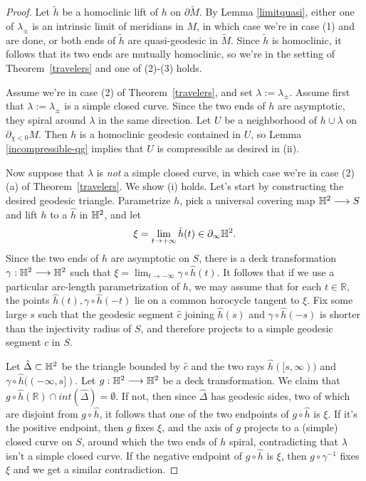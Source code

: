 \documentclass[12pt]{amsart}
\theoremstyle{definition}
\theoremstyle{remark}
\newcommand{\BR}{\mathbb R} \newcommand{\BD}{\mathbb D}
\begin{document}
\begin{proof}
Let $\tilde h$ be a homoclinic lift of $h$ on $\partial \tilde M$. By Lemma \ref{limitquasi}, either one of $\lambda_\pm$ is an intrinsic limit of meridians in $M$, in which case we're in case (1) and are done, or both ends of $\tilde h$ are quasi-geodesic in $\tilde M$. Since $\tilde h$ is homoclinic, it follows that its two ends are  mutually homoclinic, so we're in the setting of Theorem~\ref{travelers} and one of (2)-(3) holds. 

\medskip

Assume we're in case (2) of Theorem~\ref{travelers}, and set $\lambda:=\lambda_\pm$. Assume first that $\lambda:=\lambda_\pm$ is a simple closed curve.  Since the two ends of $h$ are asymptotic, they spiral around $\lambda$ in the same direction. Let $U$ be a neighborhood of $h \cup \lambda $ on $\partial_{\chi<0} M$. Then $h$ is a homoclinic geodesic contained in $U$, so Lemma \ref{incompressible-qg} implies that $U$ is compressible as desired in (ii).

Now suppose that $\lambda$ is \emph{not} a simple closed curve, in which case we're in case (2) (a) of Theorem~\ref{travelers}. We show (i) holds. Let's start by constructing the desired geodesic triangle. Parametrize $h$, pick a universal covering map $\mathbb H^2 \longrightarrow S$ and lift $h$ to a $\hat h$  in $\mathbb H^2$, and let $$\xi = \lim_{t\to +\infty} \hat h(t) \in \partial_\infty \mathbb H^2.$$ Since the two ends of $h$ are asymptotic on $S$, there is a deck transformation  $\gamma : \mathbb H^2 \longrightarrow \mathbb H^2$ such that 
$\xi = \lim_{t\to -\infty } \gamma \circ \hat h(t).$ It follows that if we use a particular arc-length parametrization of $h$, we may assume that for each $t \in \BR$, the points $\hat h(t),\gamma \circ \hat h(-t)$ lie on a common horocycle tangent to $\xi$. Fix some large $s$ such that the geodesic segment $\hat c$ joining $\hat h(s)$ and $\gamma  \circ \hat h(-s)$ is shorter than the injectivity radius of $S$, and therefore projects to a simple geodesic segment $c$ in $S$.

Let $\hat \Delta \subset \mathbb H^2$ be the triangle bounded by $\hat c$ and the two rays $\hat h([s,\infty))$ and $\gamma \circ \hat h((-\infty,s])$.  Let $g : \mathbb H^2 \longrightarrow \mathbb H^2$ be a deck transformation. We claim that $g \circ \hat h(\BR) \cap int(\hat \Delta) = \emptyset$. If not, then since $\hat \Delta$ has geodesic sides, two of which are disjoint from $g \circ \hat h$, it follows that one of the two endpoints of $g \circ \hat h$ is $\xi$. If it's the positive endpoint, then $g$ fixes $\xi$, and the axis of $g$ projects to a (simple) closed curve on $S$, around which the two ends of $h$ spiral, contradicting that $\lambda$ isn't a simple closed curve. If the negative endpoint of $g \circ \hat h$ is $\xi$, then $g \circ \gamma^{-1}$ fixes $\xi$ and we get a similar contradiction.


\end{proof}
\end{document}
